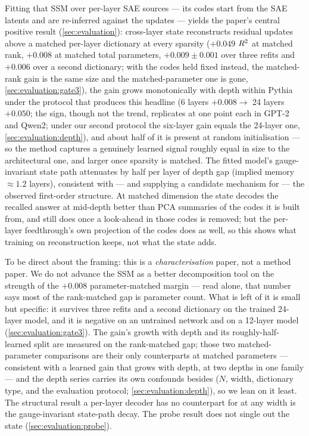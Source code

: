Fitting that SSM over per-layer SAE sources --- its codes start from the SAE
latents and are re-inferred against the updates --- yields the paper's central
positive result (\cref{sec:evaluation}): cross-layer state reconstructs
residual updates above a matched per-layer dictionary at every sparsity
($+0.049$ $R^2$  at matched rank, $+0.008$
 at matched total parameters, $+0.009 \pm 0.001$ over
three refits and $+0.006$ over a second dictionary; with the codes held
fixed instead, the matched-rank gain is the same size and the
matched-parameter one is gone, \cref{sec:evaluation:gate3}), the gain grows
monotonically with depth within Pythia under the protocol that produces this
headline (6 layers $+0.008 \to$ 24 layers
$+0.050$; the sign, though not the trend, replicates at one point each in
GPT-2 and Qwen2; under our second protocol the six-layer gain equals the
24-layer one, \cref{sec:evaluation:depth}), and about half of it is present at
random initialisation --- so the method captures a genuinely learned signal
roughly equal in size to the architectural one, and larger once sparsity is
matched. The fitted model's
gauge-invariant state path attenuates by half per layer of depth gap (implied
memory $\approx 1.2$ layers), consistent with --- and supplying a candidate
mechanism for --- the observed first-order structure. At matched dimension
the state decodes the recalled answer at mid-depth better than PCA summaries
of the codes it is built from, and still does once a look-ahead in those
codes is removed; but the per-layer feedthrough's own projection of the codes
does as well, so this shows what training on reconstruction keeps, not what
the state adds.

To be direct about the framing: this is a \emph{characterisation} paper, not
a method paper. We do not advance the SSM as a better decomposition tool on
the strength of the $+0.008$ parameter-matched margin --- read alone, that
number says most of the rank-matched gap is parameter count. What is left of
it is small but specific: it survives three refits and a second dictionary on
the trained 24-layer model, and it is negative on an untrained network and on
a 12-layer model (\cref{sec:evaluation:gate3}). The gain's growth with depth
and its roughly-half-learned split are measured on the rank-matched gap; those
two matched-parameter comparisons are their only counterparts at matched
parameters --- consistent with a learned gain that grows with depth, at two
depths in one family --- and the depth series carries its own confounds
besides ($N$, width, dictionary type, and the evaluation protocol;
\cref{sec:evaluation:depth}), so we lean on it least. The structural result
a per-layer decoder has no counterpart for at any width is the
gauge-invariant state-path decay. The probe result does not single out the
state (\cref{sec:evaluation:probe}).

